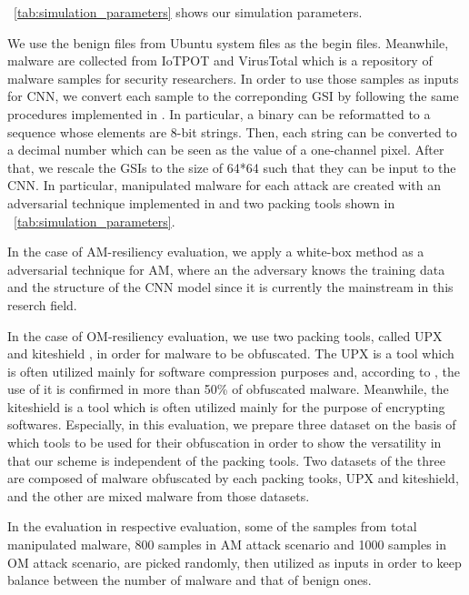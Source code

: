 \documentclass{ieeeaccess}
\begin{document}
\tablename~\ref{tab:simulation_parameters} shows our simulation parameters.  

We use the benign files from Ubuntu system files \cite{ubuntu} as the begin files.
Meanwhile, malware are collected from IoTPOT \cite{iotpot} and VirusTotal \cite{virustotal} which is a repository of malware samples for security researchers.
In order to use those samples as inputs for CNN, we convert each sample to the correponding GSI by following the same procedures implemented in \cite{previous}.
In particular, a binary can be reformatted to a sequence whose elements are 8-bit strings.
Then, each string can be converted to a decimal number which can be seen as the value of a one-channel pixel.
After that, we rescale the GSIs to the size of 64*64 such that they can be input to the CNN.
In particular, manipulated malware for each attack are created with an adversarial technique implemented in \cite{am, yamafumi} and two packing tools \cite{upx, kiteshield} shown in \tablename~\ref{tab:simulation_parameters}.

In the case of AM-resiliency evaluation, we apply a white-box method as a adversarial technique for AM, where an the adversary knows the training data and the structure of the CNN model since it is currently the mainstream in this reserch field.

In the case of OM-resiliency evaluation, we use two packing tools, called UPX \cite{upx} and kiteshield \cite{kiteshield}, in order for malware to be obfuscated.
The UPX is a tool which is often utilized mainly for software compression purposes and, according to \cite{pack_research}, the use of it is confirmed in more than 50\% of obfuscated malware. 
Meanwhile, the kiteshield is a tool which is often utilized mainly for the purpose of encrypting softwares.
Especially, in this evaluation, we prepare three dataset on the basis of which tools to be used for their obfuscation in order to show the versatility in that our scheme is independent of the packing tools.
Two datasets of the three are composed of malware obfuscated by each packing tooks, UPX and kiteshield, and the other are mixed malware from those datasets. 

In the evaluation in respective evaluation, some of the samples from total manipulated malware, 800 samples in AM attack scenario and 1000 samples in OM attack scenario, are picked randomly, then utilized as inputs in order to keep balance between the number of malware and that of benign ones.
\end{document}
